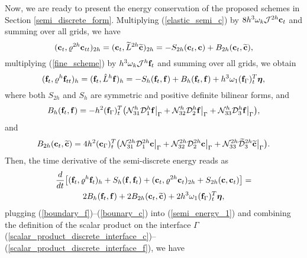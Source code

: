  Now, we are ready to present the energy conservation of the proposed schemes in Section \ref{semi_discrete_form}. Multiplying (\ref{elastic_semi_c}) by $8h^3\omega_k{\mathcal J}^{2h}{\bf c}_t$ and summing over all grids, we have
\begin{equation}\label{coarse_simple}
({\bf c}_t, {\varrho}^{2h}{\bf c}_{tt})_{2h} = ({\bf c}_t,\wt{L}^{2h}\wt{{\bf c}})_{2h} = -S_{2h}({\bf c}_t,{\bf c}) + B_{2h}({\bf c}_t,\wt{{\bf c}}),
\end{equation}
multiplying (\ref{fine_scheme}) by $h^3\omega_k{\mathcal J}^h{\bf f}_t$ and summing over all grids, we obtain
\begin{equation*}
({\bf f}_t, {\varrho}^h{\bf f}_{tt})_h = ({\bf f}_t,\hat{L}^h{\bf f})_h = -S_h({\bf f}_t,{\bf f}) + B_h({\bf f}_t,{\bf f}) 
+h^3\omega_1({\bf f}_\Gamma)_t^T{\bm \eta},
\end{equation*}
where  both $S_{2h}$ and $S_h$ are symmetric and positive definite bilinear forms, and 
\begin{equation}\label{boundary_f}
B_h ({\bf f}_t,{\bf f}) = -h^2({\bf f}_{\Gamma})_t^T\big(\mathcal{N}_{31}^h{\mathcal D}_1^h {\bf f}\big|_{\Gamma}+ \mathcal{N}_{32}^h\mathcal{D}_2^h{\bf f}\big|_{\Gamma}+\mathcal{N}_{33}^h\mathcal{D}_3^h{\bf f}\big|_{\Gamma}\big),
\end{equation}
and
\begin{equation}\label{bounary_c}
B_{2h} ({\bf c}_t,\wt{\bf c}) = 4h^2({\bf c}_{\Gamma})_t^T\big(\mathcal{N}_{31}^{2h}\mathcal{D}_1^{2h}{\bf c}\big|_{\Gamma}+ \mathcal{N}_{32}^{2h}\mathcal{D}_2^{2h}{\bf c}\big|_{\Gamma}+\mathcal{N}_{33}^{2h}\wt{\mathcal{D}}_3^{2h}\wt{{\bf c}}\big|_{\Gamma}\big).
\end{equation}
Then, the time derivative of the semi-discrete energy reads as
\begin{multline}\label{semi_energy_1}
\frac{d}{dt}\big[({\bf f}_t,\varrho^h {\bf f}_t)_h + S_h({\bf f},{\bf f}_t) + ({\bf c}_t,\varrho^{2h} {\bf c}_t)_{2h} + S_{2h}({\bf c},{\bf c}_t) \big]  = \\
2B_{h}({\bf f}_t,{\bf f}) + 2B_{2h}({\bf c}_t,\wt{\bf c}) + 2h^3\omega_1({\bf f}_\Gamma)_t^T{\bm \eta},
\end{multline}
plugging (\ref{boundary_f})--(\ref{bounary_c}) into (\ref{semi_energy_1}) and combining the definition of the scalar product on the interface $\Gamma$ (\ref{scalar_product_discrete_interface_c})--(\ref{scalar_product_discrete_interface_f}), we have
